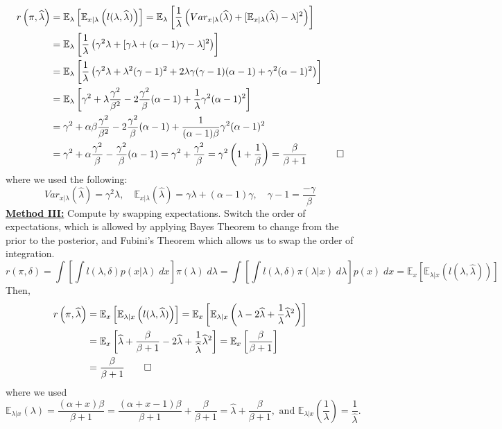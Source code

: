 \documentclass[11pt]{report}
\begin{document}
\begin{align*}
r\left(\pi, \widehat{\lambda}\right)
& = \mathbb{E}_\lambda\left[\mathbb{E}_{x|\lambda}\left(l(\lambda, \widehat{\lambda})\right) \right] 
= \mathbb{E}_\lambda\left[\frac{1}{\lambda}\left(Var_{x|\lambda}(\widehat{\lambda}) + [\mathbb{E}_{x|\lambda}(\widehat{\lambda}) -\lambda]^2 \right) \right] \\
& = \mathbb{E}_\lambda\left[\frac{1}{\lambda}\left(\gamma^2\lambda + [\gamma\lambda + (\alpha-1)\gamma-\lambda]^2 \right) \right] \\
& = \mathbb{E}_\lambda\left[\frac{1}{\lambda}\left(\gamma^2\lambda + \lambda^2(\gamma-1)^2 + 2\lambda\gamma(\gamma-1)(\alpha-1) + \gamma^2(\alpha-1)^2 \right) \right] \\
& = \mathbb{E}_\lambda\left[\gamma^2 + \lambda\frac{\gamma^2}{\beta^2} - 2\frac{\gamma^2}{\beta}(\alpha-1) + \frac{1}{\lambda}\gamma^2(\alpha-1)^2  \right] \\ 		
& = \gamma^2 + \alpha\beta\frac{\gamma^2}{\beta^2} - 2\frac{\gamma^2}{\beta}(\alpha-1) + \frac{1}{(\alpha-1)\beta}\gamma^2(\alpha-1)^2 \\   
& = \gamma^2 + \alpha\frac{\gamma^2}{\beta} - \frac{\gamma^2}{\beta}(\alpha-1)   		
= \gamma^2  + \frac{\gamma^2}{\beta}   		
= \gamma^2\left(1  + \frac{1}{\beta}\right)   	
= \frac{\beta}{\beta+1} \quad \qed 
\end{align*}
where we used the following:
$$Var_{x|\lambda}(\widehat{\lambda}) = \gamma^2\lambda, \quad  \mathbb{E}_{x|\lambda}(\widehat{\lambda}) = \gamma\lambda +(\alpha-1)\gamma, \quad \gamma-1 = \frac{-\gamma}{\beta} $$
\underline{\textbf{Method III:}} Compute by swapping expectations. \newline
Switch the order of expectations, which is allowed by applying Bayes Theorem to change from the prior to the posterior, and Fubini's Theorem which allows us to swap the order of integration.   
$$r(\pi, \delta) =  \int\left[ \int l(\lambda,\delta)p(x|\lambda) \;dx\right] \pi(\lambda)\; d\lambda = \int\left[ \int l(\lambda,\delta)\pi(\lambda|x) \;d\lambda\right] p(x)\; dx =  \mathbb{E}_x\left[\mathbb{E}_{\lambda|x}\left(l(\lambda, \widehat{\lambda})\right) \right]$$
Then, 
\begin{align*}
r\left(\pi, \widehat{\lambda}\right)
& = \mathbb{E}_x\left[\mathbb{E}_{\lambda|x}\left(l(\lambda, \widehat{\lambda})\right) \right] 
= \mathbb{E}_x\left[\mathbb{E}_{\lambda|x}\left(\lambda - 2\widehat{\lambda} + \frac{1}{\lambda}\widehat{\lambda}^2 \right) \right] \\
& = \mathbb{E}_x\left[\widehat{\lambda} + \frac{\beta}{\beta+1} - 2\widehat{\lambda} + \frac{1}{\widehat{\lambda}}\widehat{\lambda}^2  \right] 
= \mathbb{E}_x\left[\frac{\beta}{\beta+1}  \right] \\
& = \frac{\beta}{\beta+1}  \qed
\end{align*}
where we used 
$$\mathbb{E}_{\lambda|x}\left(\lambda\right) = \frac{(\alpha +x)\beta}{\beta+1} = \frac{(\alpha +x - 1)\beta}{\beta+1} + \frac{\beta}{\beta+1} = \widehat{\lambda} + \frac{\beta}{\beta+1},\text{ and } \mathbb{E}_{\lambda|x}\left(\frac{1}{\lambda}\right) = \frac{1}{\widehat{\lambda}}. $$



\end{document}
